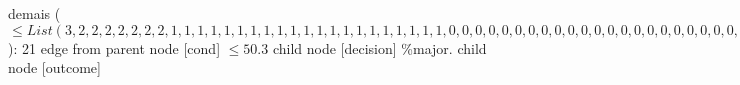 {{{{%
demais ($\leq List(3, 2, 2, 2, 2, 2, 2, 2, 1, 1, 1, 1, 1, 1, 1, 1, 1, 1, 1, 1, 1, 1, 1, 1, 1, 1, 1, 1, 1, 0, 0, 0, 0, 0, 0, 0, 0, 0, 0, 0, 0, 0, 0, 0, 0, 0, 0, 0, 0, 0, 0, 0, 0, 0, 0, 0, 0, 0, 0, 0, 0, 0, 0, 0, 0, 0, 0, 0, 0, 0, 0, 0, 0, 0, 0)$): 21} edge from parent node [cond] {$\leq50.3$}}
child {node [decision] {\%major.}
child {node [outcome] {
}}}}}
